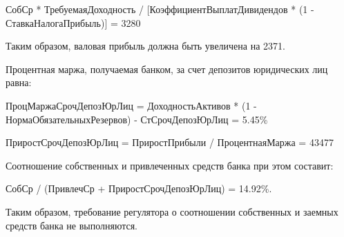 \documentclass[12pt, table]{exam}
\begin{document}
\begin{questions}
\begin{subparts}
\begin{solution}[6em]
		СобСр * ТребуемаяДоходность / [КоэффициентВыплатДивидендов * (1 - СтавкаНалогаПрибыль)] = 3280
		
		Таким образом, валовая прибыль должна быть увеличена на 2371. 
		
		Процентная маржа, получаемая банком, за счет депозитов юридических лиц равна:
		
		ПроцМаржаСрочДепозЮрЛиц = ДоходностьАктивов * (1 - НормаОбязательныхРезервов) -
		СтСрочДепозЮрЛиц = 5.45\%
		
		ПриростСрочДепозЮрЛиц =  ПриростПрибыли / ПроцентнаяМаржа = 43477
				
		Соотношение собственных и привлеченных средств банка при этом составит:
		
		СобСр / (ПривлечСр + ПриростСрочДепозЮрЛиц) = 14.92\%.
		
		Таким образом, требование регулятора о соотношении собственных и заемных средств банка не выполняются. 		
	\end{solution}
\end{subparts}
\addpoints

\end{questions}
\end{document}
